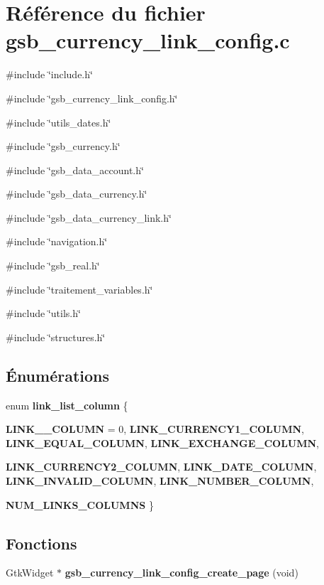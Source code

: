 \section{Référence du fichier gsb\_\-currency\_\-link\_\-config.c}
\label{gsb__currency__link__config_8c}
{\ttfamily \#include \char`\"{}include.h\char`\"{}}\par
{\ttfamily \#include \char`\"{}gsb\_\-currency\_\-link\_\-config.h\char`\"{}}\par
{\ttfamily \#include \char`\"{}utils\_\-dates.h\char`\"{}}\par
{\ttfamily \#include \char`\"{}gsb\_\-currency.h\char`\"{}}\par
{\ttfamily \#include \char`\"{}gsb\_\-data\_\-account.h\char`\"{}}\par
{\ttfamily \#include \char`\"{}gsb\_\-data\_\-currency.h\char`\"{}}\par
{\ttfamily \#include \char`\"{}gsb\_\-data\_\-currency\_\-link.h\char`\"{}}\par
{\ttfamily \#include \char`\"{}navigation.h\char`\"{}}\par
{\ttfamily \#include \char`\"{}gsb\_\-real.h\char`\"{}}\par
{\ttfamily \#include \char`\"{}traitement\_\-variables.h\char`\"{}}\par
{\ttfamily \#include \char`\"{}utils.h\char`\"{}}\par
{\ttfamily \#include \char`\"{}structures.h\char`\"{}}\par
\subsection*{Énumérations}
\begin{DoxyCompactItemize}
\item 
enum {\bf link\_\-list\_\-column} \{ \par
{\bf LINK\_\_\-COLUMN} =  0, 
{\bf LINK\_\-CURRENCY1\_\-COLUMN}, 
{\bf LINK\_\-EQUAL\_\-COLUMN}, 
{\bf LINK\_\-EXCHANGE\_\-COLUMN}, 
\par
{\bf LINK\_\-CURRENCY2\_\-COLUMN}, 
{\bf LINK\_\-DATE\_\-COLUMN}, 
{\bf LINK\_\-INVALID\_\-COLUMN}, 
{\bf LINK\_\-NUMBER\_\-COLUMN}, 
\par
{\bf NUM\_\-LINKS\_\-COLUMNS}
 \}
\end{DoxyCompactItemize}
\subsection*{Fonctions}
\begin{DoxyCompactItemize}
\item 
GtkWidget $\ast$ {\bf gsb\_\-currency\_\-link\_\-config\_\-create\_\-page} (void)
\end{DoxyCompactItemize}


